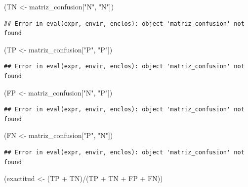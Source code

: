 \documentclass[
  12pt,
]{book}
\newenvironment{Shaded}{\begin{snugshade}}{\end{snugshade}}
\newcommand{\NormalTok}[1]{#1}
\newcommand{\OtherTok}[1]{\textcolor[rgb]{0.56,0.35,0.01}{#1}}
\newcommand{\SpecialCharTok}[1]{\textcolor[rgb]{0.00,0.00,0.00}{#1}}
\newcommand{\StringTok}[1]{\textcolor[rgb]{0.31,0.60,0.02}{#1}}
\begin{document}
\begin{Shaded}
\begin{Highlighting}[]
\NormalTok{(TN }\OtherTok{\textless{}{-}}\NormalTok{ matriz\_confusion[}\StringTok{"N"}\NormalTok{, }\StringTok{"N"}\NormalTok{])}
\end{Highlighting}
\end{Shaded}

\begin{verbatim}
## Error in eval(expr, envir, enclos): object 'matriz_confusion' not found
\end{verbatim}

\begin{Shaded}
\begin{Highlighting}[]
\NormalTok{(TP }\OtherTok{\textless{}{-}}\NormalTok{ matriz\_confusion[}\StringTok{"P"}\NormalTok{, }\StringTok{"P"}\NormalTok{])}
\end{Highlighting}
\end{Shaded}

\begin{verbatim}
## Error in eval(expr, envir, enclos): object 'matriz_confusion' not found
\end{verbatim}

\begin{Shaded}
\begin{Highlighting}[]
\NormalTok{(FP }\OtherTok{\textless{}{-}}\NormalTok{ matriz\_confusion[}\StringTok{"N"}\NormalTok{, }\StringTok{"P"}\NormalTok{])}
\end{Highlighting}
\end{Shaded}

\begin{verbatim}
## Error in eval(expr, envir, enclos): object 'matriz_confusion' not found
\end{verbatim}

\begin{Shaded}
\begin{Highlighting}[]
\NormalTok{(FN }\OtherTok{\textless{}{-}}\NormalTok{ matriz\_confusion[}\StringTok{"P"}\NormalTok{, }\StringTok{"N"}\NormalTok{])}
\end{Highlighting}
\end{Shaded}

\begin{verbatim}
## Error in eval(expr, envir, enclos): object 'matriz_confusion' not found
\end{verbatim}

\begin{Shaded}
\begin{Highlighting}[]
\NormalTok{(exactitud }\OtherTok{\textless{}{-}}\NormalTok{ (TP }\SpecialCharTok{+}\NormalTok{ TN)}\SpecialCharTok{/}\NormalTok{(TP }\SpecialCharTok{+}\NormalTok{ TN }\SpecialCharTok{+}\NormalTok{ FP }\SpecialCharTok{+}\NormalTok{ FN))}
\end{Highlighting}
\end{Shaded}
\end{document}
